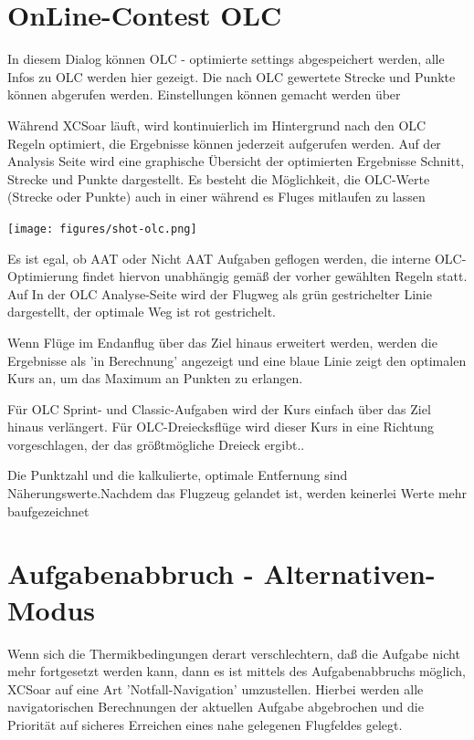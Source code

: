 \section{OnLine-Contest OLC}

In diesem Dialog können OLC - optimierte settings abgespeichert werden, alle Infos zu OLC werden hier gezeigt. Die nach OLC gewertete Strecke und Punkte können abgerufen werden. Einstellungen können gemacht werden über   

Während \textsf{XCSoar} läuft, wird kontinuierlich im Hintergrund nach den OLC Regeln optimiert, die Ergebnisse können  jederzeit  aufgerufen werden.
Auf der Analysis Seite wird eine graphische Übersicht der optimierten Ergebnisse Schnitt, Strecke und Punkte dargestellt.  Es besteht die Möglichkeit, die OLC-Werte (Strecke oder Punkte) auch in einer \infobox während es Fluges mitlaufen zu lassen

\begin{center}
\texttt{[image: figures/shot-olc.png]}
\end{center}

Es ist egal, ob AAT oder Nicht AAT Aufgaben geflogen werden, die interne OLC-Optimierung findet hiervon unabhängig gemäß der vorher gewählten Regeln statt.  Auf In der OLC Analyse-Seite wird der Flugweg als grün gestrichelter Linie dargestellt, der optimale Weg ist rot gestrichelt.

Wenn Flüge im Endanflug über das Ziel hinaus erweitert werden, werden die Ergebnisse als 'in Berechnung' angezeigt und eine blaue Linie zeigt den optimalen Kurs an, um das Maximum an Punkten zu erlangen.

Für OLC Sprint- und Classic-Aufgaben wird der Kurs einfach über das Ziel hinaus verlängert.  Für OLC-Dreiecksflüge wird dieser Kurs in eine Richtung vorgeschlagen, der das größtmögliche Dreieck ergibt.. 

Die Punktzahl und die kalkulierte, optimale Entfernung sind Näherungswerte.Nachdem das Flugzeug gelandet ist, werden keinerlei Werte mehr baufgezeichnet

\section{Aufgabenabbruch - Alternativen-Modus}\label{sec:taskabort}

Wenn sich die Thermikbedingungen derart verschlechtern, daß die Aufgabe nicht mehr fortgesetzt werden kann,
dann es ist mittels des Aufgabenabbruchs möglich, \textsf{XCSoar} auf eine Art 'Notfall-Navigation' umzustellen.
Hierbei werden alle navigatorischen Berechnungen der aktuellen Aufgabe abgebrochen und die Priorität auf sicheres
Erreichen eines nahe gelegenen Flugfeldes gelegt.

